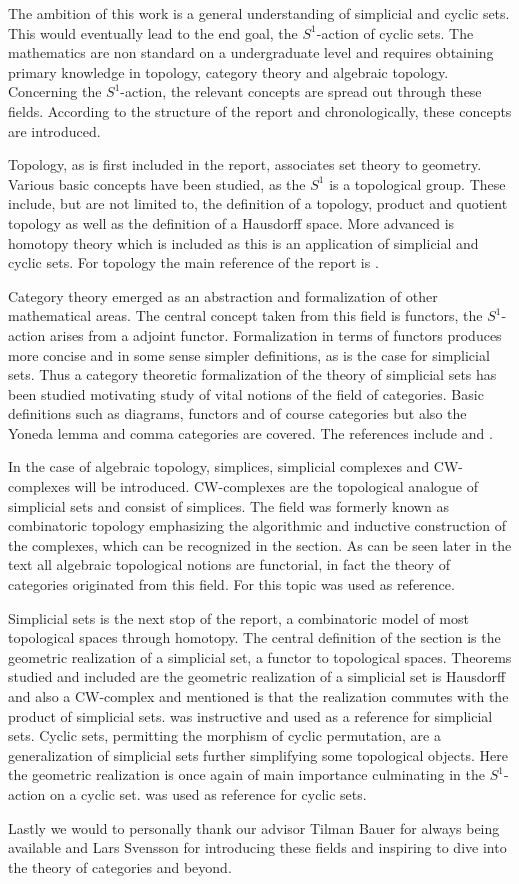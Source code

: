 \documentclass[../../main.tex]{subfiles}
\begin{document}
    The ambition of this work is a general understanding of simplicial and cyclic sets. This would eventually lead to the end goal, the $S^1$-action of cyclic sets. The mathematics are non standard on a undergraduate level and requires obtaining primary knowledge in topology, category theory and algebraic topology. Concerning the $S^1$-action, the relevant concepts are spread out through these fields. According to the structure of the report and chronologically, these concepts are introduced. 

    Topology, as is first included in the report, associates set theory to geometry. Various basic concepts have been studied, as the $S^1$ is a topological group. These include, but are not limited to, the definition of a topology, product and quotient topology as well as the definition of a Hausdorff space. More advanced is homotopy theory which is included as this is an application of simplicial and cyclic sets. For topology the main reference of the report is \cite{armstrong-basictop}.    

    Category theory emerged as an abstraction and formalization of other mathematical areas. The central concept taken from this field is functors, the $S^1$-action arises from a adjoint functor. Formalization in terms of functors produces more concise and in some sense simpler definitions, as is the case for simplicial sets. Thus a category theoretic formalization of the theory of simplicial sets has been studied motivating study of vital notions of the field of categories. Basic definitions such as diagrams, functors and of course categories but also the Yoneda lemma and comma categories are covered. The references include \cite{simp-maye} and \cite{cate-mac}.

    In the case of algebraic topology, simplices, simplicial complexes and CW-complexes will be introduced. CW-complexes are the topological analogue of simplicial sets and consist of simplices. The field was formerly known as combinatoric topology emphasizing the algorithmic and inductive construction of the complexes, which can be recognized in the section. As can be seen later in the text all algebraic topological notions are functorial, in fact the theory of categories originated from this field. For this topic \cite{simp-maye} was used as reference.

    Simplicial sets is the next stop of the report, a combinatoric model of most topological spaces through homotopy. The central definition of the section is the geometric realization of a simplicial set, a functor to topological spaces. Theorems studied and included are the geometric realization of a simplicial set is Hausdorff and also a CW-complex and mentioned is that the realization commutes with the product of simplicial sets. \cite{luk-simp} was instructive and used as a reference for simplicial sets. Cyclic sets, permitting the morphism of cyclic permutation, are a generalization of simplicial sets further simplifying some topological objects. Here the geometric realization is once again of main importance culminating in the $S^1$-action on a cyclic set. \cite{loday-cyclic} was used as reference for cyclic sets.

    Lastly we would to personally thank our advisor Tilman Bauer for always being available and Lars Svensson for introducing these fields and inspiring to dive into the theory of categories and beyond.
    
\end{document}
